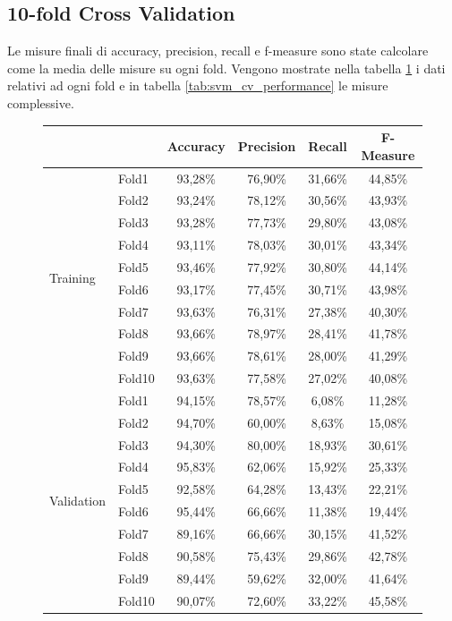 \subsection{10-fold Cross Validation}
Le misure finali di accuracy, precision, recall e 
f-measure sono state calcolare come la media delle misure su ogni fold. 
Vengono mostrate nella tabella \ref{tab:svm_cv_fold_performance} i dati relativi 
ad ogni fold e in tabella \ref{tab:svm_cv_performance} le misure complessive.

\begin{figure}[H]
	\centering
	\begin{tabular}{llcccc}
		\toprule
		&& \textbf{Accuracy} & \textbf{Precision} & \textbf{Recall} & 
		\textbf{F-Measure}  \\
		\midrule
		\multirow{10}{*}{Training} & Fold1 & 93,28\% & 76,90\% & 31,66\% & 
		44,85\% \\
		& Fold2 & 93,24\%  & 78,12\% & 30,56\% & 43,93\% \\
		& Fold3 & 93,28\%  & 77,73\% & 29,80\% & 43,08\% \\
		& Fold4 & 93,11\%  & 78,03\% & 30,01\% & 43,34\% \\
		& Fold5 & 93,46\%  & 77,92\% & 30,80\% & 44,14\% \\
		& Fold6 & 93,17\%  & 77,45\% & 30,71\% & 43,98\% \\
		& Fold7 & 93,63\%  & 76,31\% & 27,38\% & 40,30\% \\
		& Fold8 & 93,66\%  & 78,97\% & 28,41\% & 41,78\% \\
		& Fold9 & 93,66\%  & 78,61\% & 28,00\% & 41,29\% \\
		& Fold10 & 93,63\% & 77,58\% & 27,02\% & 40,08\%  \\
		\midrule
		\multirow{10}{*}{Validation} & Fold1 & 94,15\% & 78,57\% & 6,08\% & 
		11,28\% \\
		& Fold2 & 94,70\% & 60,00\% & 8,63\% & 15,08\% \\
		& Fold3 & 94,30\% & 80,00\% & 18,93\% & 30,61\% \\
		& Fold4 & 95,83\% & 62,06\% & 15,92\% & 25,33\% \\
		& Fold5 & 92,58\% & 64,28\% & 13,43\% & 22,21\% \\
		& Fold6 & 95,44\% & 66,66\% & 11,38\% & 19,44\% \\
		& Fold7 & 89,16\% & 66,66\% & 30,15\% & 41,52\% \\
		& Fold8 & 90,58\% & 75,43\% & 29,86\% & 42,78\% \\
		& Fold9 & 89,44\% & 59,62\% & 32,00\% & 41,64\% \\
		& Fold10 & 90,07\% & 72,60\% & 33,22\% & 45,58\% \\
		\bottomrule 
	\end{tabular}
	\label{tab:svm_cv_fold_performance}
\end{figure}

